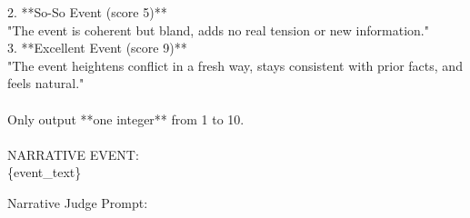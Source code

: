 \documentclass[11pt]{article}
\begin{document}
\begin{small}
\begin{tcolorbox}[colback=gray!10, colframe=gray!40, arc=4mm, boxrule=0pt]
2. **So-So Event (score 5)**\\
   "The event is coherent but bland, adds no real tension or new information."\\
3. **Excellent Event (score 9)**\\
   "The event heightens conflict in a fresh way, stays consistent with prior facts, and feels natural."\\
\\
Only output **one integer** from 1 to 10.\\
\\
NARRATIVE EVENT:\\
\{event\_text\}\\
\end{tcolorbox}
\end{small}

\newpage

\noindent
Narrative Judge Prompt:
\end{document}
